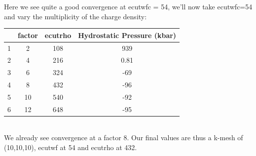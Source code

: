 \documentclass[twoside,twocolumn,11pt]{article} %
\begin{document}
Here we see quite a good convergence at ecutwfc = 54, we'll now take ecutwfc=54 and vary the multiplicity of the charge density:
\begin{table}[ht]
\begin{tabular}{c|c|c|c}
	&factor&ecutrho&Hydrostatic Pressure (kbar)\\
	\hline
	1&2&108&939\\
	2&4&216&0.81\\
	3&6&324&-69\\
	4&8&432&-96\\
	5&10&540&-92\\
	6&12&648&-95\\
\end{tabular}
\end{table}\\
We already see convergence at a factor 8. Our final values are thus a k-mesh of (10,10,10), ecutwf at 54 and ecutrho at 432.
\end{document}
